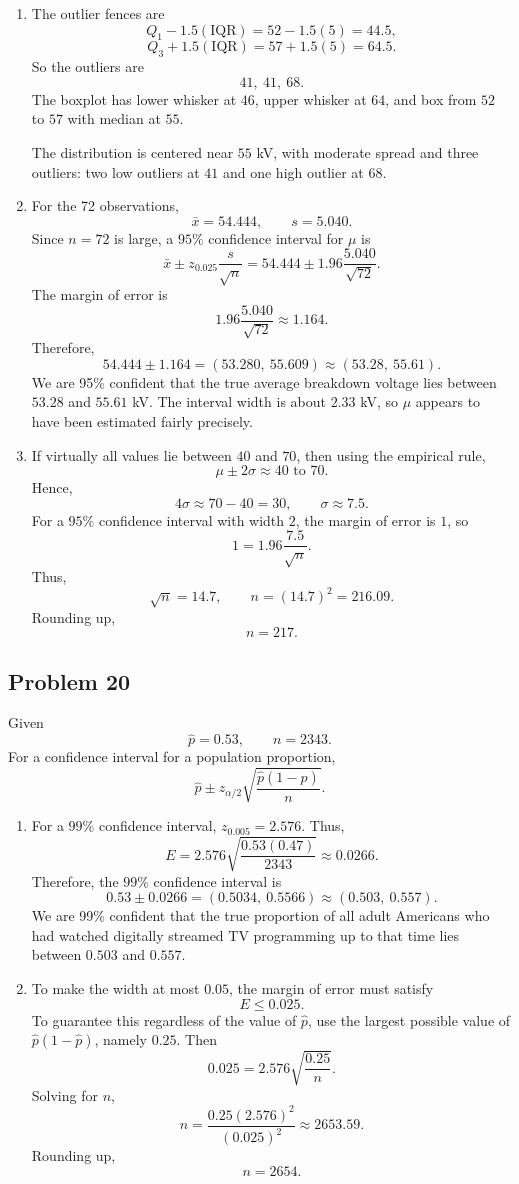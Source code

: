 \documentclass[11pt]{article}
\begin{document}
\begin{enumerate}
\item[(a)] The outlier fences are
\[
Q_1-1.5(\text{IQR})=52-1.5(5)=44.5,
\]
\[
Q_3+1.5(\text{IQR})=57+1.5(5)=64.5.
\]
So the outliers are
\[
41,\ 41,\ 68.
\]
The boxplot has lower whisker at $46$, upper whisker at $64$, and box from $52$ to $57$ with median at $55$.

The distribution is centered near $55$ kV, with moderate spread and three outliers: two low outliers at $41$ and one high outlier at $68$.

\item[(b)] For the 72 observations,
\[
\bar{x}=54.444, \qquad s=5.040.
\]
Since $n=72$ is large, a $95\%$ confidence interval for $\mu$ is
\[
\bar{x}\pm z_{0.025}\frac{s}{\sqrt{n}}=54.444\pm 1.96\frac{5.040}{\sqrt{72}}.
\]
The margin of error is
\[
1.96\frac{5.040}{\sqrt{72}}\approx 1.164.
\]
Therefore,
\[
54.444\pm 1.164=(53.280,\ 55.609)\approx(53.28,\ 55.61).
\]
We are 95\% confident that the true average breakdown voltage lies between $53.28$ and $55.61$ kV. The interval width is about $2.33$ kV, so $\mu$ appears to have been estimated fairly precisely.

\item[(c)] If virtually all values lie between $40$ and $70$, then using the empirical rule,
\[
\mu\pm 2\sigma \approx 40 \text{ to } 70.
\]
Hence,
\[
4\sigma\approx 70-40=30, \qquad \sigma\approx 7.5.
\]
For a $95\%$ confidence interval with width $2$, the margin of error is $1$, so
\[
1=1.96\frac{7.5}{\sqrt{n}}.
\]
Thus,
\[
\sqrt{n}=14.7, \qquad n=(14.7)^2=216.09.
\]
Rounding up,
\[
n=217.
\]
\end{enumerate}

\subsection*{Problem 20}

Given
\[
\hat{p}=0.53, \qquad n=2343.
\]
For a confidence interval for a population proportion,
\[
\hat{p}\pm z_{\alpha/2}\sqrt{\frac{\hat{p}(1-\hat{p})}{n}}.
\]

\begin{enumerate}
\item[(a)] For a $99\%$ confidence interval, $z_{0.005}=2.576$. Thus,
\[
E=2.576\sqrt{\frac{0.53(0.47)}{2343}}\approx 0.0266.
\]
Therefore, the $99\%$ confidence interval is
\[
0.53\pm 0.0266=(0.5034,\ 0.5566)\approx(0.503,\ 0.557).
\]
We are 99\% confident that the true proportion of all adult Americans who had watched digitally streamed TV programming up to that time lies between $0.503$ and $0.557$.

\item[(b)] To make the width at most $0.05$, the margin of error must satisfy
\[
E\le 0.025.
\]
To guarantee this regardless of the value of $\hat{p}$, use the largest possible value of $\hat{p}(1-\hat{p})$, namely $0.25$. Then
\[
0.025=2.576\sqrt{\frac{0.25}{n}}.
\]
Solving for $n$,
\[
n=\frac{0.25(2.576)^2}{(0.025)^2}\approx 2653.59.
\]
Rounding up,
\[
n=2654.
\]
\end{enumerate}
\end{document}
